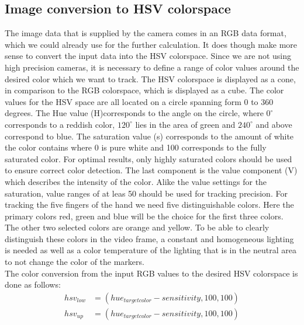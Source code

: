 \subsection{Image conversion to HSV colorspace}
The image data that is supplied by the camera comes in an RGB data format, which we could already use for the further calculation. It does though make more sense to convert the input data into the HSV colorspace. Since we are not using high precision cameras, it is necessary to define a range of color values around the desired color which we want to track. The HSV colorspace is displayed as a cone, in comparison to the RGB colorspace, which is displayed as a cube. The color values for the HSV space are all located on a circle spanning form 0 to 360 degrees. The Hue value (H)corresponds to the angle on the circle, where $0^\circ$ corresponds to a reddish color, $120^\circ$ lies in the area of green and $240^\circ$ and above correspond to blue. The saturation value (s) corresponds to the amount of white the color contains  where 0 is pure white and 100 corresponds to the fully saturated color. For optimal results, only highly saturated colors should be used to ensure correct color detection. The last component is the value component (V) which describes the intensity of the color. Alike the value settings for the saturation, value ranges of at leas 50 should be used for tracking precision.
For tracking the five fingers of the hand we need five distinguishable colors. Here the primary colors red, green and blue will be the choice for the first three colors. The other two selected colors are orange and yellow. To be able to clearly distinguish these colors in the video frame, a constant and homogeneous lighting is needed as well as a color temperature of the lighting that is in the neutral area to not change the color of the markers.
\\The color conversion from the input RGB values to the desired HSV colorspace is done as follows:
\begin{equation}
\begin{split}
hsv_{low}&=(hue_{targetcolor}-sensitivity,100,100)\\
hsv_{up}&=(hue_{targetcolor}-sensitivity,100,100)\\
\end{split}
\end{equation}
